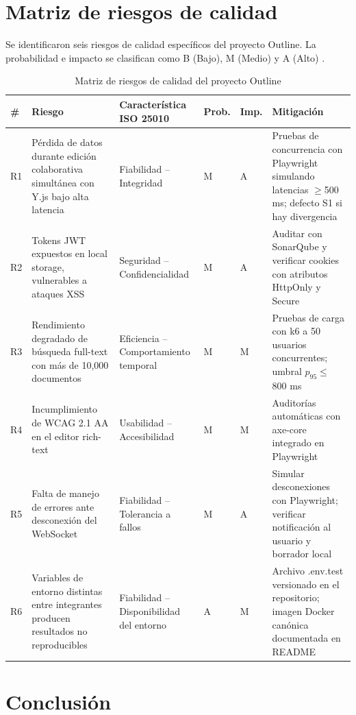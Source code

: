 \documentclass{report}
\begin{document}
\chapter*{Matriz de riesgos de calidad}

Se identificaron seis riesgos de calidad específicos del proyecto Outline. La probabilidad e impacto se clasifican como B (Bajo), M (Medio) y A (Alto) \cite{pressman2020}.

\begin{table}[h]
\centering
\begin{tabular}{|p{0.4cm}|p{3.5cm}|p{2.8cm}|p{0.7cm}|p{0.7cm}|p{4cm}|}
\hline
\textbf{\#} & \textbf{Riesgo} & \textbf{Característica ISO 25010} & \textbf{Prob.} & \textbf{Imp.} & \textbf{Mitigación} \\
\hline
R1 & Pérdida de datos durante edición colaborativa simultánea con Y.js bajo alta latencia & Fiabilidad -- Integridad & M & A & Pruebas de concurrencia con Playwright simulando latencias $\geq$500 ms; defecto S1 si hay divergencia \\
\hline
R2 & Tokens JWT expuestos en local storage, vulnerables a ataques XSS & Seguridad -- Confidencialidad & M & A & Auditar con SonarQube y verificar cookies con atributos HttpOnly y Secure \\
\hline
R3 & Rendimiento degradado de búsqueda full-text con más de 10,000 documentos & Eficiencia -- Comportamiento temporal & M & M & Pruebas de carga con k6 a 50 usuarios concurrentes; umbral $p_{95} \leq$ 800 ms \\
\hline
R4 & Incumplimiento de WCAG 2.1 AA en el editor rich-text & Usabilidad -- Accesibilidad & M & M & Auditorías automáticas con axe-core integrado en Playwright \\
\hline
R5 & Falta de manejo de errores ante desconexión del WebSocket & Fiabilidad -- Tolerancia a fallos & M & A & Simular desconexiones con Playwright; verificar notificación al usuario y borrador local \\
\hline
R6 & Variables de entorno distintas entre integrantes producen resultados no reproducibles & Fiabilidad -- Disponibilidad del entorno & A & M & Archivo .env.test versionado en el repositorio; imagen Docker canónica documentada en README \\
\hline
\end{tabular}
\caption{Matriz de riesgos de calidad del proyecto Outline}
\end{table}


\chapter*{Conclusión}
\end{document}
